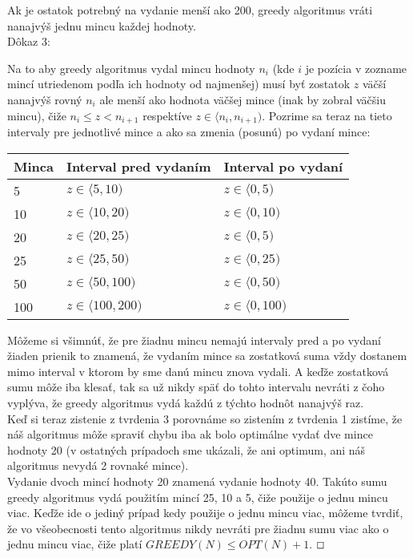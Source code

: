 \documentclass[a4paper]{article}
\begin{document}
Ak je ostatok potrebný na vydanie menší ako 200, greedy algoritmus vráti nanajvýš jednu mincu každej hodnoty.   
\\

Dôkaz 3:

Na to aby greedy algoritmus vydal mincu hodnoty $n_i$ (kde $i$ je pozícia v zozname mincí utriedenom podľa ich hodnoty od najmenšej) musí byť zostatok $z$ väčší nanajvýš rovný $n_i$ ale menší ako hodnota väčšej mince (inak by zobral väčšiu mincu), čiže $n_i \leq z < n_{i+1}$ respektíve $z \in \langle n_i, n_{i+1} )$. Pozrime sa teraz na tieto intervaly pre jednotlivé mince a ako sa zmenia (posunú) po vydaní mince:

\begin{table}[!h]
	\begin{tabular}{|l|l|l|}
		\hline
		Minca & Interval pred vydaním & Interval po vydaní \\ \hline
		5     &$z \in \langle 5, 10 )$&$z \in \langle 0, 5 )$\\ \hline
		10    &$z \in \langle 10, 20 )$&$z \in \langle 0, 10 )$\\ \hline
		20    &$z \in \langle 20, 25 )$&$z \in \langle 0, 5 )$\\ \hline
		25    &$z \in \langle 25, 50 )$&$z \in \langle 0, 25 )$\\ \hline
		50    &$z \in \langle 50, 100 )$&$z \in \langle 0, 50 )$\\ \hline
		100   &$z \in \langle 100, 200 )$&$z \in \langle 0, 100 )$\\ \hline
	\end{tabular}
\end{table} 
Môžeme si všimnúť, že pre žiadnu mincu nemajú intervaly pred a po vydaní žiaden prienik to znamená, že vydaním mince sa zostatková suma vždy dostanem mimo interval v ktorom by sme danú mincu znova vydali. A keďže zostatková sumu môže iba klesať, tak sa už nikdy späť do tohto intervalu nevráti z čoho vyplýva, že greedy algoritmus vydá každú z týchto hodnôt nanajvýš raz.
\\

Keď si teraz zistenie z tvrdenia 3 porovnáme so zistením z tvrdenia 1 zistíme, že náš algoritmus môže spraviť chybu iba ak bolo optimálne vydať dve mince hodnoty 20 (v ostatných prípadoch sme ukázali, že ani optimum, ani náš algoritmus nevydá 2 rovnaké mince). 
\\

Vydanie dvoch mincí hodnoty 20 znamená vydanie hodnoty 40. Takúto sumu greedy algoritmus vydá použitím mincí 25, 10 a 5, čiže použije o jednu mincu viac. Keďže ide o jediný prípad kedy použije o jednu mincu viac, môžeme tvrdiť, že vo všeobecnosti tento algoritmus nikdy nevráti pre žiadnu sumu viac ako o jednu mincu viac, čiže platí $GREEDY(N) \leq OPT(N)+1$. $\oblong$
\end{document}
